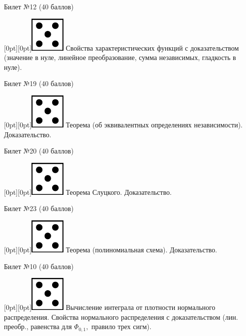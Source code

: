 \documentclass[10pt]{article}
\begin{document}
\begin{center} {\Large Билет №12 (40 баллов)} \end{center}

\raisebox{-1pt}[0pt][0pt]{\includegraphics[width=0.02\linewidth]{5.png}} Свойства характеристических функций с доказательством (значение в нуле, линейное преобразование, сумма независимых, гладкость в нуле). \\

\begin{center} {\Large Билет №19 (40 баллов)} \end{center}

\raisebox{-1pt}[0pt][0pt]{\includegraphics[width=0.02\linewidth]{5.png}} Теорема (об эквивалентных определениях независимости). Доказательство. \\

\begin{center} {\Large Билет №20 (40 баллов)} \end{center}

\raisebox{-1pt}[0pt][0pt]{\includegraphics[width=0.02\linewidth]{5.png}} Теорема Слуцкого. Доказательство. \\

\begin{center} {\Large Билет №23 (40 баллов)} \end{center}

\raisebox{-1pt}[0pt][0pt]{\includegraphics[width=0.02\linewidth]{5.png}} Теорема (полиномиальная схема). Доказательство. \\

\begin{center} {\Large Билет №10 (40 баллов)} \end{center}

\raisebox{-1pt}[0pt][0pt]{\includegraphics[width=0.02\linewidth]{5.png}} Вычисление интеграла от плотности нормального распределения.  Свойства нормального распределения с доказательством (лин. преобр., равенства для $\Phi_{0,1},$ правило трех сигм). \\
\end{document}
